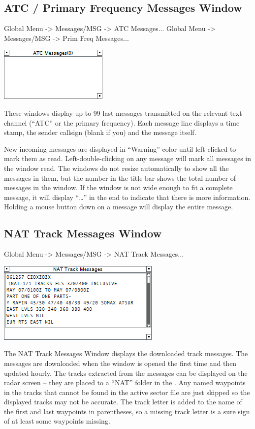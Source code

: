 \documentclass[11pt,a4paper,oldfontcommands]{memoir}
\begin{document}
\subsection{ATC / Primary Frequency Messages Window}
\label{win:atcmw}
\label{win:pfmw}

Global Menu -> Messages/MSG -> ATC Messages...
Global Menu -> Messages/MSG -> Prim Freq Messages...

\includegraphics{img/atc.png}

These windows display up to 99 last messages transmitted on the relevant text channel (“ATC” or the primary frequency). Each message line displays a time stamp, the sender callsign (blank if you) and the message itself.

New incoming messages are displayed in “Warning” color until left-clicked to mark them as read. Left-double-clicking on any message will mark all messages in the window read. The windows do not resize automatically to show all the messages in them, but the number in the title bar shows the total number of messages in the window. If the window is not wide enough to fit a complete message, it will display “…” in the end to indicate that there is more information. Holding a mouse button down on a message will display the entire message.

\subsection{NAT Track Messages Window}
\label{win:nattmw}

Global Menu -> Messages/MSG -> NAT Track Messages...

\includegraphics{img/nat.png}

The NAT Track Messages Window displays the downloaded track messages. The messages are downloaded when the window is opened the first time and then updated hourly. The tracks extracted from the messages can be displayed on the radar screen – they are placed to a “NAT” folder in the \textit{}. Any named waypoints in the tracks that cannot be found in the active sector file are just skipped so the displayed tracks may not be accurate. The track letter is added to the name of the first and last waypoints in parentheses, so a missing track letter is a sure sign of at least some waypoints missing.
\end{document}
